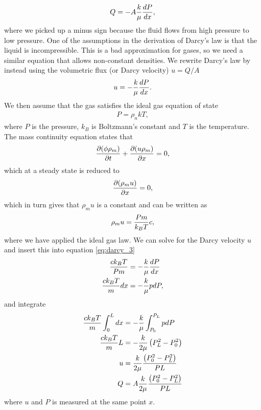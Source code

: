 \begin{align}
\label{eq:darcy_2}
	Q = -A{k\over \mu}{dP\over dx},
\end{align}
where we picked up a minus sign because the fluid flows from high pressure to low pressure. One of the assumptions in the derivation of Darcy's law is that the liquid is incompressible.\cite{darcy_derivation} This is a bad approximation for gases, so we need a similar equation that allows non-constant densities. We rewrite Darcy's law by instead using the volumetric flux (or Darcy velocity) $u=Q/A$
\begin{align}
	\label{eq:darcy_3}
	u = -{k\over \mu}{dP\over dx}.
\end{align}
We then assume that the gas satisfies the ideal gas equation of state
\begin{align}
	P = \rho_n kT,
\end{align}
where $P$ is the pressure, $k_B$ is Boltzmann's constant and $T$ is the temperature. The mass continuity equation states that
\begin{align}
	\frac{\partial (\phi \rho_m)}{\partial t} + \frac{\partial (u\rho_m)}{\partial x} = 0,
\end{align}
which at a steady state is reduced to
\begin{align}
	\frac{\partial (\rho_m u)}{\partial x} = 0,
\end{align}
which in turn gives that $\rho_m u$ is a constant and can be written as
\begin{align}
	\rho_m u = {Pm\over k_BT} c,
\end{align}
where we have applied the ideal gas law. We can solve for the Darcy velocity $u$ and insert this into equation \eqref{eq:darcy_3}
\begin{align}
	{ck_BT\over P m} &= -{k\over \mu}{dP\over dx}\\
	{ck_BT\over m}dx &= -{k\over \mu}pdP,
\end{align}
and integrate 
\begin{align}
\nonumber
	{ck_BT\over m}\int_0^L dx &= -{k\over \mu}\int_{P_0}^{P_L} pdP\\
\nonumber
	{ck_BT\over m}L &= -{k\over 2\mu}\left(P_L^2 - P_0^2\right)\\
\nonumber
	u &= {k\over 2\mu}{\left(P_0^2 - P_L^2\right)\over PL}\\
\label{eq:darcy_gas}
	Q &= A{k\over 2\mu}{\left(P_0^2 - P_L^2\right)\over PL}
\end{align}
where $u$ and $P$ is measured at the same point $x$. 

